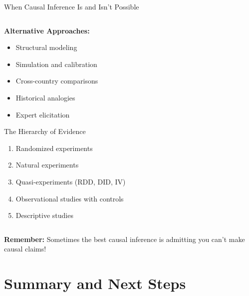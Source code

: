 \documentclass[aspectratio=169,11pt]{beamer}
\begin{document}
\begin{frame}{When Causal Inference Is and Isn't Possible}
\begin{columns}
\begin{column}{0.5\textwidth}
\vspace{0.3cm}
\textbf{Alternative Approaches:}
\begin{itemize}
\item Structural modeling
\item Simulation and calibration
\item Cross-country comparisons
\item Historical analogies
\item Expert elicitation
\end{itemize}

\vspace{0.3cm}
\begin{block}{The Hierarchy of Evidence}
\begin{enumerate}
\item Randomized experiments
\item Natural experiments
\item Quasi-experiments (RDD, DID, IV)
\item Observational studies with controls
\item Descriptive studies
\end{enumerate}
\end{block}
\end{column}
\end{columns}

\textbf{Remember:} Sometimes the best causal inference is admitting you can't make causal claims!
\end{frame}

\section{Summary and Next Steps}
\end{document}
